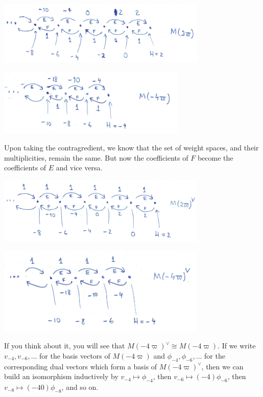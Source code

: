 \documentclass[12pt]{article}
\theoremstyle{plain}
\theoremstyle{definition}
\numberwithin{equation}{section}
\begin{document}
\begin{center}
\includegraphics[width=100mm]{M-2.png}
\end{center}

\begin{center}
\includegraphics[width=90mm]{M-minus-4.png}
\end{center}



Upon taking the contragredient, we know that the set of weight spaces, and their multiplicities, remain the same. But now the coefficients of $F$ become the coefficients of $E$ and vice versa.


\begin{center}
\includegraphics[width=100mm]{M-2-dual.png}
\end{center}

\begin{center}
\includegraphics[width=100mm]{M-minus-4-dual.png}
\end{center}


If you think about it, you will see that $M(-4\varpi)^\vee \cong M(-4\varpi)$. If we write $v_{-4}, v_{-6}, \ldots$ for the basis vectors of $M(-4\varpi)$ and $\phi_{-4}, \phi_{-6}, \ldots$ for the corresponding dual vectors which form a basis of $M(-4\varpi)^\vee$, then we can build an isomorphism inductively by $v_{-4} \mapsto \phi_{-4}$, then $v_{-6} \mapsto (-4) \phi_{-6}$, then $v_{-8} \mapsto (-40) \phi_{-8}$, and so on.
\end{document}
